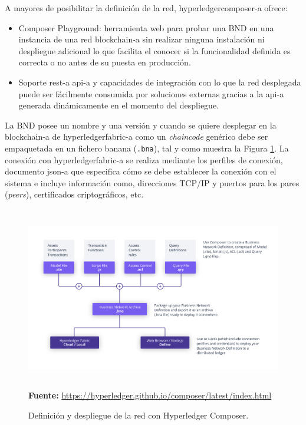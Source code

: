 \documentclass[12pt,a4paper, twoside]{report}
\begin{document}
	A mayores de posibilitar la definición de la red, \gls{hyperledgercomposer-a} ofrece:

	\begin{itemize}
		\item Composer Playground: herramienta web para probar una BND en una instancia de una red \gls{blockchain-a} sin realizar ninguna instalación ni despliegue adicional lo que facilita el conocer si la funcionalidad definida es correcta o no antes de su puesta en producción.
		\item Soporte \gls{rest-a} \gls{api-a} y capacidades de integración con lo que la red desplegada puede ser fácilmente consumida por soluciones externas gracias a la \gls{api-a} generada dinámicamente en el momento del despliegue.
	\end{itemize}
	
	La BND posee un nombre y una versión y cuando se quiere desplegar en la \gls{blockchain-a} de \gls{hyperledgerfabric-a} como un \textit{\gls{chaincode}} genérico debe ser empaquetada en un fichero banana (\texttt{.bna}), tal y como muestra la Figura \ref{fig:stateArt_hyperledgercomposer}. La conexión con \gls{hyperledgerfabric-a} se realiza mediante los perfiles de conexión, documento \gls{json-a} que especifica cómo se debe establecer la conexión con el sistema e incluye información como, direcciones TCP/IP y puertos para los pares (\textit{peers}), certificados criptográficos, etc.
	
	\begin{figure}[!ht]   
		\caption{Definición y despliegue de la red con Hyperledger Composer.} 
		\begin{center} 
			\includegraphics[width=17cm,height=8cm]{Images/stateArt/hc} \\
			\label{fig:stateArt_hyperledgercomposer} 
			\textbf{Fuente:} \url{https://hyperledger.github.io/composer/latest/index.html}
		\end{center}  
	\end{figure}
	
\end{document}
